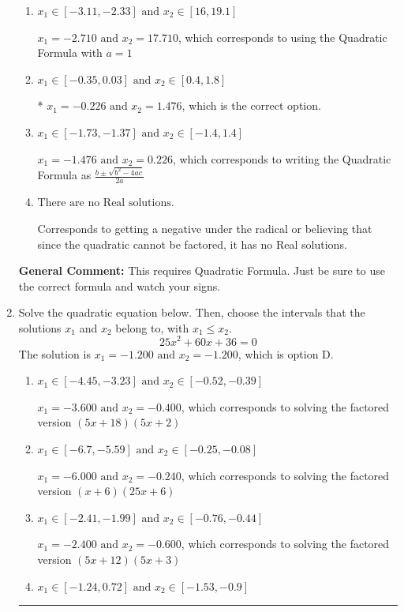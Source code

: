 \documentclass{extbook}[14pt]
\newcommand{\litem}[1]{\item #1

\rule{\textwidth}{0.4pt}}
\begin{document}
\begin{enumerate}
{\begin{enumerate}[label=\Alph*.]
 $x_1 = -19.796 \text{ and } x_2 = 21.046$, which corresponds to writing the Quadratic Formula as $-\frac{b}{2a} \pm \sqrt{b^2 - 4ac}$.
\item \( x_1 \in [-3.11, -2.33] \text{ and } x_2 \in [16, 19.1] \)

 $x_1 = -2.710 \text{ and } x_2 = 17.710$, which corresponds to using the Quadratic Formula with $a=1$
\item \( x_1 \in [-0.35, 0.03] \text{ and } x_2 \in [0.4, 1.8] \)

* $x_1 = -0.226 \text{ and } x_2 = 1.476$, which is the correct option.
\item \( x_1 \in [-1.73, -1.37] \text{ and } x_2 \in [-1.4, 1.4] \)

 $x_1 = -1.476 \text{ and } x_2 = 0.226$, which corresponds to writing the Quadratic Formula as $\frac{b \pm \sqrt{b^2 - 4ac}}{2a}$
\item \( \text{There are no Real solutions.} \)

Corresponds to getting a negative under the radical or believing that since the quadratic cannot be factored, it has no Real solutions.
\end{enumerate}

\textbf{General Comment:} This requires Quadratic Formula. Just be sure to use the correct formula and watch your signs.
}
\litem{
Solve the quadratic equation below. Then, choose the intervals that the solutions $x_1$ and $x_2$ belong to, with $x_1 \leq x_2$.
\[ 25x^{2} +60 x + 36 = 0 \]The solution is \( x_1 = -1.200 \text{ and } x_2 = -1.200 \), which is option D.\begin{enumerate}[label=\Alph*.]
\item \( x_1 \in [-4.45, -3.23] \text{ and } x_2 \in [-0.52, -0.39] \)

$x_1 = -3.600 \text{ and } x_2 = -0.400$, which corresponds to solving the factored version $(5x + 18)(5x + 2)$
\item \( x_1 \in [-6.7, -5.59] \text{ and } x_2 \in [-0.25, -0.08] \)

$x_1 = -6.000 \text{ and } x_2 = -0.240$, which corresponds to solving the factored version $(x + 6)(25x + 6)$
\item \( x_1 \in [-2.41, -1.99] \text{ and } x_2 \in [-0.76, -0.44] \)

$x_1 = -2.400 \text{ and } x_2 = -0.600$, which corresponds to solving the factored version $(5x + 12)(5x + 3)$
\item \( x_1 \in [-1.24, 0.72] \text{ and } x_2 \in [-1.53, -0.9] \)


\end{enumerate}}
\end{enumerate}
\end{document}
